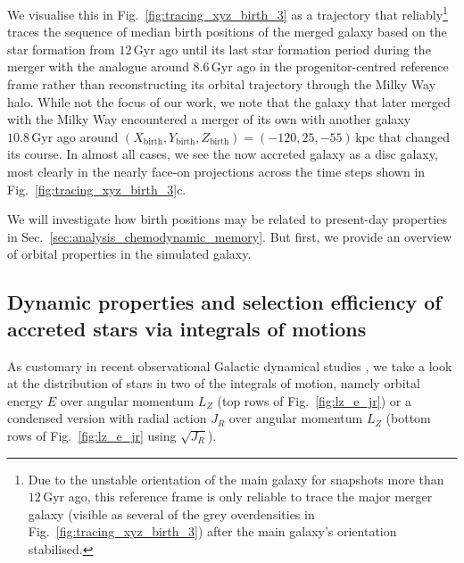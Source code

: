 \documentclass[fleqn,usenatbib]{mnras}
\newcommand{\changed}[1]{{{#1}}}
\begin{document}
We visualise this in Fig.~\ref{fig:tracing_xyz_birth_3} as a trajectory that reliably\footnote{Due to the unstable orientation of the main galaxy for snapshots more than $12\,\mathrm{Gyr}$ ago, this reference frame is only reliable to trace the major merger galaxy (visible as several of the grey overdensities in Fig.~\ref{fig:tracing_xyz_birth_3}) after the main galaxy's orientation stabilised.} traces \changed{the sequence of median birth positions of the} merged galaxy based on the star formation from $12\,\mathrm{Gyr}$ ago until its last star formation period during the merger with the analogue around $8.6\,\mathrm{Gyr}$ ago \changed{in the progenitor-centred reference frame rather than reconstructing its orbital trajectory through the Milky Way halo.} While not the focus of our work, we note that the galaxy that later merged with the Milky Way encountered a merger of its own with another galaxy $10.8\,\mathrm{Gyr}$ ago around $(X_\mathrm{birth},Y_\mathrm{birth},Z_\mathrm{birth}) = (-120,25,-55)\,\mathrm{kpc}$ that changed its course. In almost all cases, we see the now accreted galaxy as \changed{a disc galaxy, most clearly in the nearly face-on projections across the time steps shown in Fig.~\ref{fig:tracing_xyz_birth_3}c.}

We will investigate how birth positions may be related to present-day properties in Sec.~\ref{sec:analysis_chemodynamic_memory}. But first, we provide an overview of orbit\changed{al} properties in the simulated galaxy.

\subsection{Dynamic properties and selection efficiency of accreted stars via integrals of motions} \label{sec:analysis_dynamic_properties}

As customary in recent observational Galactic dynamical studies \citep[for example][]{Helmi2018, Trick2019, Helmi2020, Buder2022}, we take a look at the distribution of stars in two of the integrals of motion, namely orbit\changed{al} energy $E$ over angular momentum $L_Z$ (top rows of Fig.~\ref{fig:lz_e_jr}) or a condensed version with radial action $J_R$ over angular momentum $L_Z$ (bottom rows of Fig.~\ref{fig:lz_e_jr} using $\sqrt{J_R}$).
\end{document}
